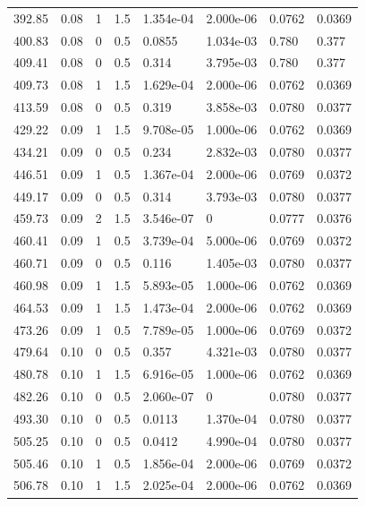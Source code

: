 \documentclass[preview]{standalone}
\begin{document}
{{{\begin{tabular}{L{1.2cm}C{1.2cm} C{0.3cm}C{0.5cm} C{1.4cm}C{1.4cm} C{1.4cm}C{1.4cm}}
  392.85  &  0.08  & 1     & 1.5 &  1.354e-04  & 2.000e-06  & 0.0762 &  0.0369   \\ 
  400.83  &  0.08  & 0     & 0.5 &  0.0855  & 1.034e-03  & 0.780 &  0.377   \\ 
  409.41  &  0.08  & 0     & 0.5 &  0.314  & 3.795e-03  & 0.780 &  0.377   \\ 
  409.73  &  0.08  & 1     & 1.5 &  1.629e-04  & 2.000e-06  & 0.0762 &  0.0369   \\ 
  413.59  &  0.08  & 0     & 0.5 &  0.319  & 3.858e-03  & 0.0780 &  0.0377   \\ 
  429.22  &  0.09  & 1     & 1.5 &  9.708e-05  & 1.000e-06  & 0.0762 &  0.0369   \\ 
  434.21  &  0.09  & 0     & 0.5 &  0.234  & 2.832e-03  & 0.0780 &  0.0377   \\ 
  446.51  &  0.09  & 1     & 0.5 &  1.367e-04  & 2.000e-06  & 0.0769 &  0.0372   \\ 
  449.17  &  0.09  & 0     & 0.5 &  0.314  & 3.793e-03  & 0.0780 &  0.0377   \\ 
  459.73  &  0.09  & 2     & 1.5 &  3.546e-07  & 0  & 0.0777 &  0.0376   \\ 
  460.41  &  0.09  & 1     & 0.5 &  3.739e-04  & 5.000e-06  & 0.0769 &  0.0372   \\ 
  460.71  &  0.09  & 0     & 0.5 &  0.116  & 1.405e-03  & 0.0780 &  0.0377   \\ 
  460.98  &  0.09  & 1     & 1.5 &  5.893e-05  & 1.000e-06  & 0.0762 &  0.0369   \\ 
  464.53  &  0.09  & 1     & 1.5 &  1.473e-04  & 2.000e-06  & 0.0762 &  0.0369   \\ 
  473.26  &  0.09  & 1     & 0.5 &  7.789e-05  & 1.000e-06  & 0.0769 &  0.0372   \\ 
  479.64  &  0.10  & 0     & 0.5 &  0.357  & 4.321e-03  & 0.0780 &  0.0377   \\ 
  480.78  &  0.10  & 1     & 1.5 &  6.916e-05  & 1.000e-06  & 0.0762 &  0.0369   \\ 
  482.26  &  0.10  & 0     & 0.5 &  2.060e-07  & 0  & 0.0780 &  0.0377   \\ 
  493.30  &  0.10  & 0     & 0.5 &  0.0113  & 1.370e-04  & 0.0780 &  0.0377   \\ 
  505.25  &  0.10  & 0     & 0.5 &  0.0412  & 4.990e-04  & 0.0780 &  0.0377   \\ 
  505.46  &  0.10  & 1     & 0.5 &  1.856e-04  & 2.000e-06  & 0.0769 &  0.0372   \\ 
  506.78  &  0.10  & 1     & 1.5 &  2.025e-04  & 2.000e-06  & 0.0762 &  0.0369   \\ 

\end{tabular}}}}
\end{document}
